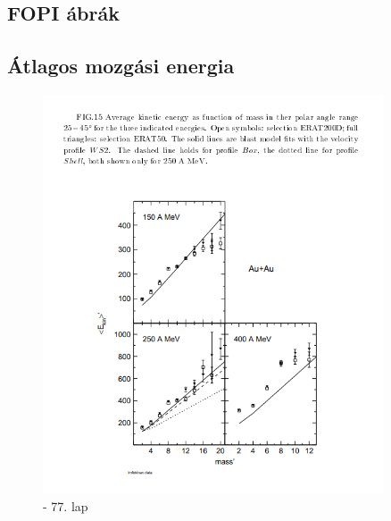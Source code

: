 \documentclass[a4paper,12pt]{article}
\begin{document}
\begin{appendices}
\section{FOPI ábrák}
\subsection{Átlagos mozgási energia}
\begin{figure}[H]
\centering
\includegraphics[width=0.9\textwidth]{./avgkin.png}
\caption{\cite{REISDORF1997493} - 77. lap}
\end{figure}

\end{appendices}
\end{document}
